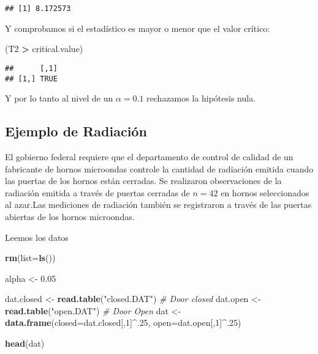 \documentclass[
]{article}
\newenvironment{Shaded}{\begin{snugshade}}{\end{snugshade}}
\newcommand{\CommentTok}[1]{\textcolor[rgb]{0.56,0.35,0.01}{\textit{#1}}}
\newcommand{\DataTypeTok}[1]{\textcolor[rgb]{0.13,0.29,0.53}{#1}}
\newcommand{\DecValTok}[1]{\textcolor[rgb]{0.00,0.00,0.81}{#1}}
\newcommand{\FloatTok}[1]{\textcolor[rgb]{0.00,0.00,0.81}{#1}}
\newcommand{\KeywordTok}[1]{\textcolor[rgb]{0.13,0.29,0.53}{\textbf{#1}}}
\newcommand{\NormalTok}[1]{#1}
\newcommand{\OperatorTok}[1]{\textcolor[rgb]{0.81,0.36,0.00}{\textbf{#1}}}
\newcommand{\StringTok}[1]{\textcolor[rgb]{0.31,0.60,0.02}{#1}}
\begin{document}
\begin{verbatim}
## [1] 8.172573
\end{verbatim}

Y comprobamos si el estadístico es mayor o menor que el valor crítico:

\begin{Shaded}
\begin{Highlighting}[]
\NormalTok{(T2 }\OperatorTok{>}\StringTok{ }\NormalTok{critical.value)}
\end{Highlighting}
\end{Shaded}

\begin{verbatim}
##      [,1]
## [1,] TRUE
\end{verbatim}

Y por lo tanto al nivel de un \(\alpha=0.1\) rechazamos la hipótesis
nula.

\hypertarget{ejemplo-de-radiaciuxf3n}{%
\subsection{Ejemplo de Radiación}\label{ejemplo-de-radiaciuxf3n}}

El gobierno federal requiere que el departamento de control de calidad
de un fabricante de hornos microondas controle la cantidad de radiación
emitida cuando las puertas de los hornos están cerradas. Se realizaron
observaciones de la radiación emitida a través de puertas cerradas de
\(n = 42\) en hornos seleccionados al azar.Las mediciones de radiación
también se registraron a través de las puertas abiertas de los hornos
microondas.

Leemos los datos

\begin{Shaded}
\begin{Highlighting}[]
\KeywordTok{rm}\NormalTok{(}\DataTypeTok{list=}\KeywordTok{ls}\NormalTok{())}

\NormalTok{alpha <-}\StringTok{ }\FloatTok{0.05}

\NormalTok{dat.closed <-}\StringTok{ }\KeywordTok{read.table}\NormalTok{(}\StringTok{"closed.DAT"}\NormalTok{) }\CommentTok{# Door closed}
\NormalTok{dat.open <-}\StringTok{ }\KeywordTok{read.table}\NormalTok{(}\StringTok{"open.DAT"}\NormalTok{) }\CommentTok{# Door Open}
\NormalTok{dat <-}\StringTok{ }\KeywordTok{data.frame}\NormalTok{(}\DataTypeTok{closed=}\NormalTok{dat.closed[,}\DecValTok{1}\NormalTok{]}\OperatorTok{^}\NormalTok{.}\DecValTok{25}\NormalTok{, }
                  \DataTypeTok{open=}\NormalTok{dat.open[,}\DecValTok{1}\NormalTok{]}\OperatorTok{^}\NormalTok{.}\DecValTok{25}\NormalTok{)}

\KeywordTok{head}\NormalTok{(dat)}
\end{Highlighting}
\end{Shaded}
\end{document}
